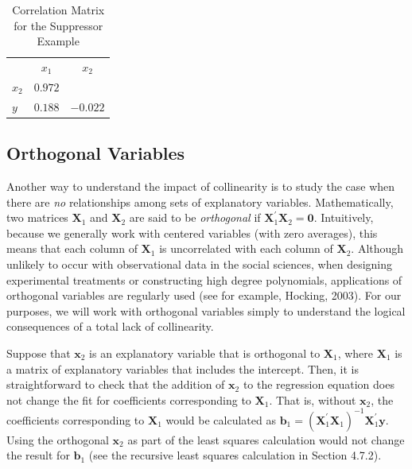 \begin{table}[h]

\caption{\label{T5:Suppress} Correlation Matrix for the Suppressor
Example}

\begin{tabular}{ccc}
\hline
& $x_1$ & $x_2$ \\
\multicolumn{1}{l}{$x_2$} & $0.972$ &  \\
\multicolumn{1}{l}{$y$} & $0.188$ & $-0.022$ \\ \hline
\end{tabular}
\linetjed {}
\end{table}

\subsection{Orthogonal Variables}\label{S5:Orthogonal} Another way to understand the impact of
collinearity is to study the case when there are \emph{no}
relationships among sets of explanatory variables. Mathematically,
two matrices $\mathbf{X}_1$ and $\mathbf{X}_2$ are said to be
\emph{orthogonal} if $\mathbf{X}_1^{\prime}\mathbf{X}_2=
\mathbf{0}.$ Intuitively, because we generally work with centered
variables (with zero averages), this means that each column of
$\mathbf{X}_1$ is uncorrelated with each column of $\mathbf{X}_2$.
Although unlikely to occur with observational data in the social
sciences, when designing experimental treatments or constructing
high degree polynomials, applications of orthogonal variables are
regularly used (see for example, Hocking, 2003). For our purposes,
we will work with orthogonal variables simply to understand the
logical consequences of a total lack of collinearity.

Suppose that $\mathbf{x}_2$ is an explanatory variable that is
orthogonal to $\mathbf{X}_1$, where $\mathbf{X}_1$ is a matrix of
explanatory variables that includes the intercept. Then, it is
straightforward to check that the addition of $\mathbf{x}_2$ to the
regression equation does not change the fit for coefficients
corresponding to $\mathbf{X}_1$. That is, without $\mathbf{x}_2$,
the coefficients corresponding to $\mathbf{X}_1$ would be calculated
as $\mathbf{b}_1= \left(\mathbf{X}_1^{\prime} \mathbf{X}_1
\right)^{-1} \mathbf{X}_1^{\prime} \mathbf{y}.$ Using the orthogonal
$\mathbf{x}_2$ as part of the least squares calculation would not
change the result for $\mathbf{b}_1$ (see the recursive least
squares calculation in Section 4.7.2).

